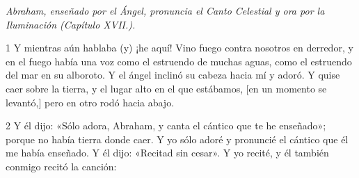 \par \textit{Abraham, enseñado por el Ángel, pronuncia el Canto Celestial y ora por la Iluminación (Capítulo XVII.).}

\par 1 Y mientras aún hablaba (y) ¡he aquí! Vino fuego contra nosotros en derredor, y en el fuego había una voz como el estruendo de muchas aguas, como el estruendo del mar en su alboroto. Y el ángel inclinó su cabeza hacia mí y adoró. Y quise caer sobre la tierra, y el lugar alto en el que estábamos, [en un momento se levantó,] pero en otro rodó hacia abajo.

\par 2 Y él dijo: «Sólo adora, Abraham, y canta el cántico que te he enseñado»; porque no había tierra donde caer. Y yo sólo adoré y pronuncié el cántico que él me había enseñado. Y él dijo: «Recitad sin cesar». Y yo recité, y él también conmigo recitó la canción:

